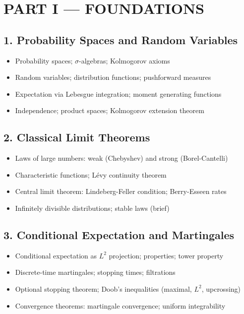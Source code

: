 \section{PART I --- FOUNDATIONS}

\subsection{1. Probability Spaces and Random Variables}
\begin{itemize}
\item Probability spaces; $\sigma$-algebras; Kolmogorov axioms
\item Random variables; distribution functions; pushforward measures
\item Expectation via Lebesgue integration; moment generating functions
\item Independence; product spaces; Kolmogorov extension theorem
\end{itemize}

\subsection{2. Classical Limit Theorems}
\begin{itemize}
\item Laws of large numbers: weak (Chebyshev) and strong (Borel-Cantelli)
\item Characteristic functions; L\'evy continuity theorem
\item Central limit theorem: Lindeberg-Feller condition; Berry-Esseen rates
\item Infinitely divisible distributions; stable laws (brief)
\end{itemize}

\subsection{3. Conditional Expectation and Martingales}
\begin{itemize}
\item Conditional expectation as $L^2$ projection; properties; tower property
\item Discrete-time martingales; stopping times; filtrations
\item Optional stopping theorem; Doob's inequalities (maximal, $L^2$, upcrossing)
\item Convergence theorems: martingale convergence; uniform integrability
\end{itemize}

